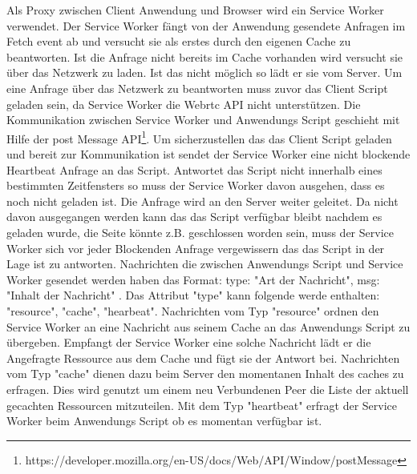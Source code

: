 \begin{description}
Als Proxy zwischen Client Anwendung und Browser wird ein Service Worker verwendet. Der Service Worker fängt von der Anwendung gesendete Anfragen im Fetch event ab und versucht sie als erstes durch den eigenen Cache zu beantworten. Ist die Anfrage nicht bereits im Cache vorhanden wird versucht sie über das \pTp Netzwerk zu laden. Ist das nicht möglich so lädt er sie vom Server. 
Um eine Anfrage über das \pTp Netzwerk zu beantworten muss zuvor das Client Script geladen sein, da Service Worker die Webrtc API nicht unterstützen. Die Kommunikation zwischen Service Worker und Anwendungs Script geschieht mit Hilfe der post Message API\footnote{https://developer.mozilla.org/en-US/docs/Web/API/Window/postMessage}. Um sicherzustellen das das Client Script geladen und bereit zur Kommunikation ist sendet der Service Worker eine nicht blockende Heartbeat Anfrage an das Script. Antwortet das Script nicht innerhalb eines bestimmten Zeitfensters so muss der Service Worker davon ausgehen, dass es noch nicht geladen ist. Die Anfrage wird an den Server weiter geleitet. Da nicht davon ausgegangen werden kann das das Script verfügbar bleibt nachdem es geladen wurde, die Seite könnte z.B. geschlossen worden sein, muss der Service Worker sich vor jeder Blockenden Anfrage vergewissern das das Script in der Lage ist zu antworten.
Nachrichten die zwischen Anwendungs Script und Service Worker gesendet werden haben das Format: { type: "Art der Nachricht", msg: "Inhalt der Nachricht" }. Das Attribut "type" kann folgende werde enthalten: "resource", "cache", "hearbeat". Nachrichten vom Typ "resource" ordnen den Service Worker an eine Nachricht aus seinem Cache an das Anwendungs Script zu übergeben. Empfangt der Service Worker eine solche Nachricht lädt er die Angefragte Ressource aus dem Cache und fügt sie der Antwort bei. Nachrichten vom Typ "cache" dienen dazu beim Server den momentanen Inhalt des caches zu erfragen. Dies wird genutzt um einem neu Verbundenen Peer die Liste der aktuell gecachten Ressourcen mitzuteilen. Mit dem Typ "heartbeat" erfragt der Service Worker beim Anwendungs Script ob es momentan verfügbar ist.   

\end{description}
